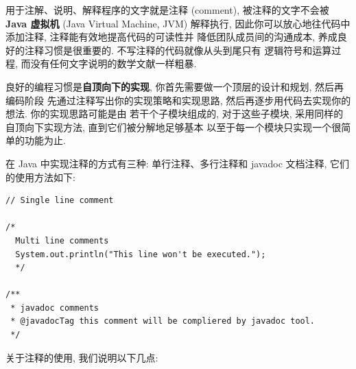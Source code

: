 \documentclass[10pt,UTF8]{book} %
\begin{document}
用于注解、说明、解释程序的文字就是注释 (comment), 
被注释的文字不会被 \textbf{Java 虚拟机} (Java Virtual Machine, JVM) 解释执行,
因此你可以放心地往代码中添加注释,
注释能有效地提高代码的可读性并
降低团队成员间的沟通成本, 养成良好的注释习惯是很重要的. 不写注释的代码就像从头到尾只有
逻辑符号和运算过程, 而没有任何文字说明的数学文献一样粗暴.

良好的编程习惯是\textbf{自顶向下的实现}, 你首先需要做一个顶层的设计和规划, 然后再编码阶段
先通过注释写出你的实现策略和实现思路, 然后再逐步用代码去实现你的想法. 你的实现思路可能是由
若干个子模块组成的, 对于这些子模块, 采用同样的自顶向下实现方法, 直到它们被分解地足够基本
以至于每一个模块只实现一个很简单的功能为止.

在 Java 中实现注释的方式有三种: 单行注释、多行注释和 javadoc 文档注释, 它们的使用方法如下:
\begin{lstlisting}
// Single line comment

/*
  Multi line comments
  System.out.println("This line won't be executed.");
  */

/**
 * javadoc comments
 * @javadocTag this comment will be compliered by javadoc tool.
 */
\end{lstlisting}
关于注释的使用, 我们说明以下几点:
\end{document}
